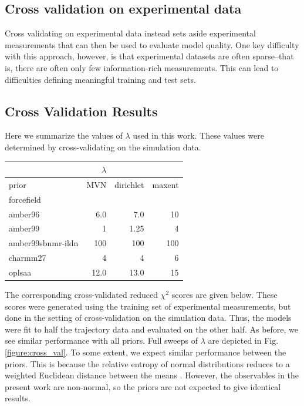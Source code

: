 \documentclass[12pt]{article}
\begin{document}
\subsection*{Cross validation on experimental data}

Cross validating on experimental data instead sets aside experimental measurements that can then be used to evaluate model quality.  One key difficulty with this approach, however, is that experimental datasets are often sparse--that is, there are often only few information-rich measurements.  This can lead to difficulties defining meaningful training and test sets.  

\subsection*{Cross Validation Results}

Here we summarize the values of $\lambda$ used in this work.  These values were determined by cross-validating on the simulation data.  

\vspace{5mm}

\begin{tabular}{lrrr}
\toprule
{}                &$\lambda$  &   &      \\
\midrule
prior &       MVN &  dirichlet & maxent \\
forcefield        &           &         \\
amber96           &      6.0  &    7.0  & 10 \\
amber99           &      1    &    1.25 & 4 \\
amber99sbnmr-ildn &      100  &    100  & 100 \\
charmm27          &      4    &   4     & 6 \\
oplsaa            &     12.0 &    13.0  & 15 \\
\bottomrule
\end{tabular}

\vspace{5mm}

The corresponding cross-validated reduced $\chi^2$ scores are given below.  These scores were generated using the training set of experimental measurements, but done in the setting of cross-validation on the simulation data.  Thus, the models were fit to half the trajectory data and evaluated on the other half.  As before, we see similar performance with all priors.  Full sweeps of $\lambda$ are depicted in Fig. \ref{figure:cross_val}.  To some extent, we expect similar performance between the priors.  This is because the relative entropy of normal distributions reduces to a weighted Euclidean distance between the means \cite{relative_entropy_wiki}.  However, the observables in the present work are non-normal, so the priors are not expected to give identical results.
\end{document}

